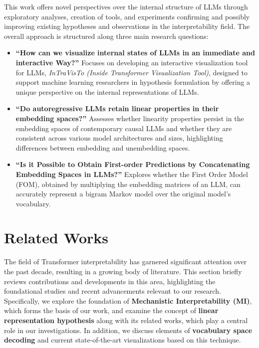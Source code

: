 \documentclass[11pt,a4paper,twocolumn]{article}
\begin{document}
This work offers novel perspectives over the internal structure of LLMs through exploratory analyses, creation of tools, and experiments confirming and possibly improving existing hypotheses and observations in the interpretability field.
The overall approach is structured along three main research questions: 
\begin{itemize}[leftmargin=12pt]
    \item \textbf{``How can we visualize internal states of LLMs in an immediate and interactive Way?''} Focuses on developing an interactive visualization tool for LLMs, \emph{InTraVisTo (Inside Transformer Visualization Tool)}, designed to support machine learning researchers in hypothesis formulation by offering a unique perspective on the internal representations of LLMs.
    \item \textbf{``Do autoregressive LLMs retain linear properties in their embedding spaces?''} Assesses whether linearity properties persist in the embedding spaces of contemporary causal LLMs and whether they are consistent across various model architectures and sizes, highlighting differences between embedding and unembedding spaces.
    \item \textbf{``Is it Possible to Obtain First-order Predictions by Concatenating Embedding Spaces in LLMs?''} Explores whether the First Order Model (FOM), obtained by multiplying the embedding matrices of an LLM, can accurately represent a bigram Markov model over the original model's vocabulary.
\end{itemize}

\section{Related Works}\label{sec:related_works}
The field of Transformer interpretability has garnered significant attention over the past decade, resulting in a growing body of literature.
This section briefly reviews contributions and developments in this area, highlighting the foundational studies and recent advancements relevant to our research.
Specifically, we explore the foundation of \textbf{Mechanistic Interpretability (MI)}, which forms the basis of our work, and examine the concept of \textbf{linear representation hypothesis} along with its related works, which play a central role in our investigations.
In addition, we discuss elements of \textbf{vocabulary space decoding} and current state-of-the-art visualizations based on this technique.
\end{document}
